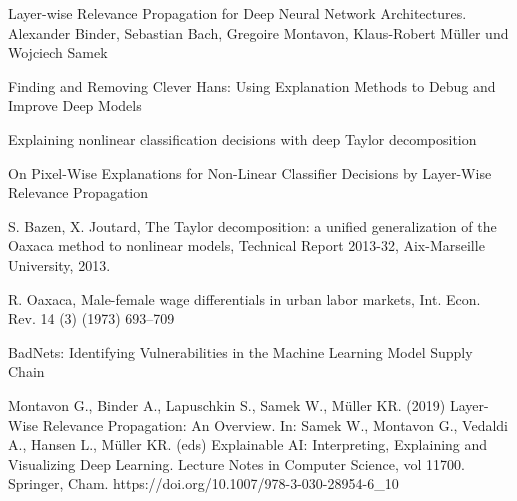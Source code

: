 \documentclass{article}
\theoremstyle{break}
\begin{document}
	\newpage
	\begin{thebibliography}{}
		 Layer-wise Relevance Propagation for Deep
		Neural Network Architectures. Alexander Binder, Sebastian Bach, Gregoire Montavon, Klaus-Robert Müller und Wojciech Samek
		
		Finding and Removing Clever Hans:
		Using Explanation Methods to Debug and Improve Deep Models
		
		 Explaining nonlinear classification decisions with deep Taylor
		decomposition
		
		 On Pixel-Wise Explanations for Non-Linear
		Classifier Decisions by Layer-Wise Relevance
		Propagation
		
		 S. Bazen, X. Joutard, The Taylor decomposition: a unified generalization of the
		Oaxaca method to nonlinear models, Technical Report 2013-32, Aix-Marseille
		University, 2013.
		
		 R. Oaxaca, Male-female wage differentials in urban labor markets, Int. Econ. Rev.
		14 (3) (1973) 693–709
		
		 BadNets: Identifying Vulnerabilities in the Machine Learning Model Supply Chain
		
		Montavon G., Binder A., Lapuschkin S., Samek W., Müller KR. (2019) Layer-Wise Relevance Propagation: An Overview. In: Samek W., Montavon G., Vedaldi A., Hansen L., Müller KR. (eds) Explainable AI: Interpreting, Explaining and Visualizing Deep Learning. Lecture Notes in Computer Science, vol 11700. Springer, Cham. https://doi.org/10.1007/978-3-030-28954-6\_10
		
				
	\end{thebibliography}

	
	
\end{document}

